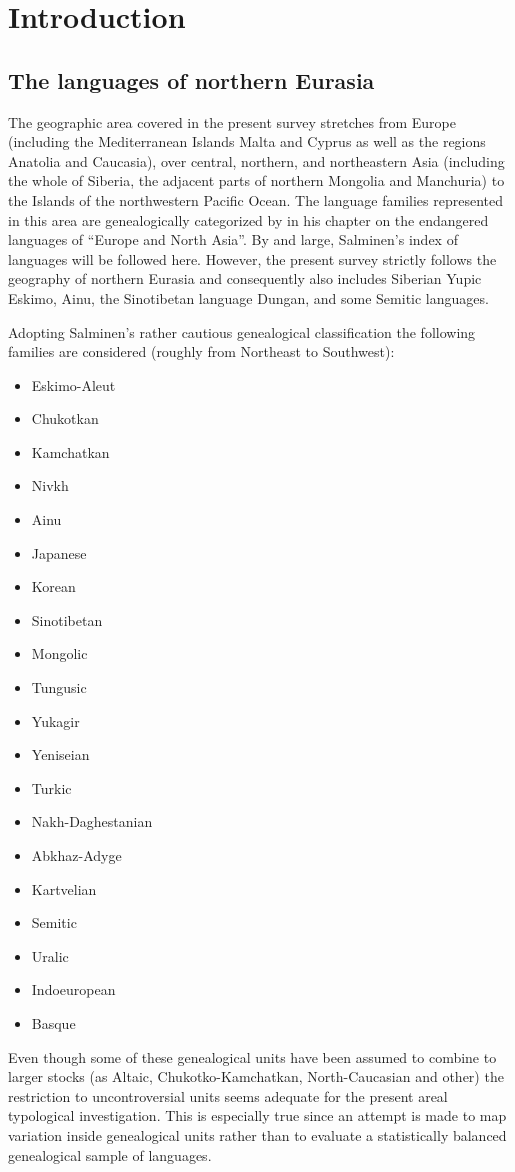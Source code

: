 
\chapter{Introduction}
\section{The languages of northern Eurasia}
The geographic area covered in the present survey stretches from Europe (including the Mediterranean Islands Malta and Cyprus as well as the regions Anatolia and Caucasia), over central, northern, and northeastern Asia (including the whole of Siberia, the adjacent parts of northern Mongolia and Manchuria) to the Islands of the northwestern Pacific Ocean. The language families represented in this area are genealogically categorized by \cite{salminen2007} in his chapter on the endangered languages of “Europe and North Asia”. By and large, Salminen's index of languages will be followed here. However, the present survey strictly follows the geography of northern Eurasia and consequently also includes Siberian Yupic Eskimo, Ainu, the Sinotibetan language Dungan, and some Semitic languages.

Adopting Salminen's rather cautious genealogical classification the following families are considered (roughly from Northeast to Southwest):
\begin{itemize}
\item{Eskimo-Aleut}
\item{Chukotkan}
\item{Kamchatkan}
\item{Nivkh}
\item{Ainu}
\item{Japanese}
\item{Korean}
\item{Sinotibetan}
\item{Mongolic}
\item{Tungusic}
\item{Yukagir}
\item{Yeniseian}
\item{Turkic}
\item{Nakh-Daghestanian}
\item{Abkhaz-Adyge}
\item{Kartvelian}
\item{Semitic}
\item{Uralic}
\item{Indoeuropean}
\item{Basque}
\end{itemize}
Even though some of these genealogical units have been assumed to combine to larger stocks (as Altaic, Chukotko-Kamchatkan, North-Caucasian and other) the restriction to uncontroversial units seems adequate for the present areal typological investigation. This is especially true since an attempt is made to map variation inside genealogical units rather than to evaluate a statistically balanced genealogical sample of languages.

